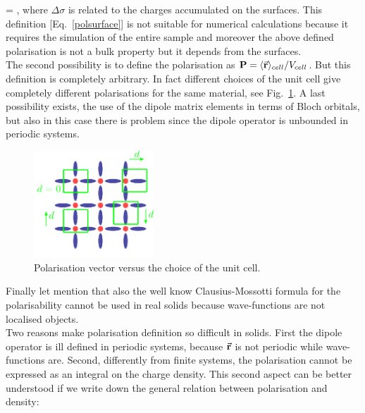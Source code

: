 \be
\Delta \PP = ,
\label{polsurface}
\ee
where $\Delta \sigma$ is related to the charges accumulated on the surfaces.\cite{vanderbilt1993electric} 
This definition [Eq.~\ref{polsurface}] is not suitable for numerical calculations because it requires the simulation of the entire sample and moreover the above defined polarisation is not a bulk property but it depends from the surfaces.\\ 
The second possibility is to define the polarisation as  $ {\bf P} = \langle \vec {{\bf r}} \rangle_{cell}/V_{cell}$. But this definition is completely arbitrary. In fact different choices of the unit cell give completely different polarisations for the same material, see Fig.~\ref{cellpol}. A last possibility exists, the use of the dipole matrix elements in terms of Bloch orbitals, but also in this case there is problem since the dipole operator is unbounded in periodic systems.\\
\begin{figure}
    \vspace{-0.7cm}
  \begin{center}
    \includegraphics[width=0.4\textwidth]{Figures/wrong_polarization1}
  \end{center}
  \caption{Polarisation vector versus the choice of the unit cell. \label{cellpol} }
\end{figure}
Finally let mention that also the well know Clausius-Mossotti formula for the polarisability\cite{Mossotti} cannot be used in real solids because wave-functions are not localised objects.\\
Two reasons make polarisation definition so difficult in solids. First the dipole operator is ill defined in periodic systems, because $\vec {{\bf r}}$ is not periodic while wave-functions are. Second, differently from finite systems, the polarisation cannot be expressed as an integral on the charge density\cite{Martin1998}.
This second aspect can be better understood if we write down the general relation between polarisation and density:
\be
